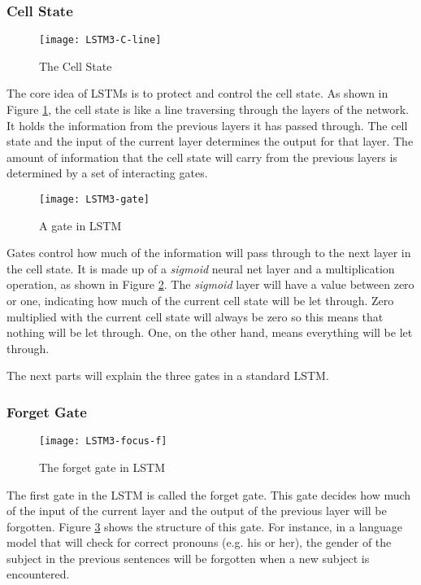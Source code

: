     \subsubsection{Cell State}
        \begin{figure}[H]
        \centering
        \texttt{[image: LSTM3-C-line]}
        \caption{The Cell State \cite{olah2015understanding}}
        \label{fig:cell-state}
        \end{figure}
        The core idea of LSTMs is to protect and control the cell state. As shown in Figure \ref{fig:cell-state}, the cell state is like a line traversing through the layers of the network. It holds the information from the previous layers it has passed through. The cell state and the input of the current layer determines the output for that layer. The amount of information that the cell state will carry from the previous layers is determined by a set of interacting gates.

        \begin{figure}[H]
        \centering
        \texttt{[image: LSTM3-gate]}
        \caption{A gate in LSTM \cite{olah2015understanding}}
        \label{fig:lstm-gate}
        \end{figure}
        Gates control how much of the information will pass through to the next layer in the cell state. It is made up of a \textit{sigmoid} neural net layer and a multiplication operation, as shown in Figure \ref{fig:lstm-gate}. The \textit{sigmoid} layer will have a value between zero or one, indicating how much of the current cell state will be let through. Zero multiplied with the current cell state will always be zero so this means that nothing will be let through. One, on the other hand, means everything will be let through.

        The next parts will explain the three gates in a standard LSTM.

    \subsubsection{Forget Gate}
        \begin{figure}[H]
        \centering
        \texttt{[image: LSTM3-focus-f]}
        \caption{The forget gate in LSTM \cite{olah2015understanding}}
        \label{fig:lstm-forget-gate}
        \end{figure}
        The first gate in the LSTM is called the forget gate. This gate decides how much of the input of the current layer and the output of the previous layer will be forgotten. Figure \ref{fig:lstm-forget-gate} shows the structure of this gate. For instance, in a language model that will check for correct pronouns (e.g. his or her), the gender of the subject in the previous sentences will be forgotten when a new subject is encountered.

